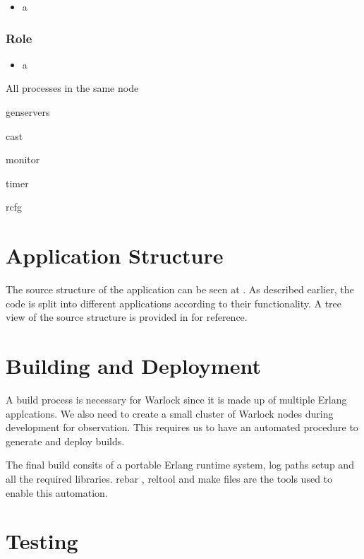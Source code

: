 \begin{itemize}
  \item a
\end{itemize}

\subsubsection{Role}

\begin{itemize}
  \item a
\end{itemize}





All processes in the same node

genservers

cast

monitor

timer

rcfg


\section{Application Structure}

The source structure of the application can be seen at .
As described earlier, the code is split into different applications according
to their functionality. A tree view of the source structure is provided in
 for reference.

\section{Building and Deployment}

A build%
process is necessary for Warlock since it is made up of multiple Erlang
applcations. We also need to create a small cluster of Warlock nodes during 
development for observation. This requires us to have an automated procedure
to generate and deploy builds.

The final build consits of a portable Erlang runtime system, log
paths setup and all the required libraries. rebar \citep{rebar}, reltool
\citep{reltool} and make files \citep{makefiles} are the tools used to enable
this automation. 

\section{Testing}

